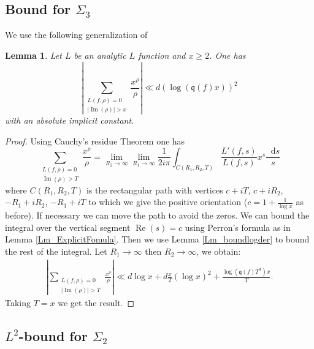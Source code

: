 \documentclass[a4paper,10pt]{amsart}
\theoremstyle{plain}
\newtheorem{lem}[theo]{Lemma}
\theoremstyle{definition}
\begin{document}
\subsection{Bound for $\Sigma_{3}$}

We use the following generalization of \cite[Lem. 2.1]{FioEC}
\begin{lem}\label{Lm_Fiorilli2.1}
Let $L$ be an analytic $L$ function and $x \geq 2$.
One has
$$\left\lvert\sum_{\substack{L(f,\rho)=0 \\ \lvert\operatorname{Im}(\rho)\rvert>x}}\frac{x^{\rho}}{\rho} \right\rvert \ll 
 d\left(\log(\mathfrak{q}(f)x)\right)^{2}$$
 with an absolute implicit constant.
\end{lem}

\begin{proof}
Using Cauchy's residue Theorem one has 
$$\sum_{\substack{L(f,\rho)=0 \\ \operatorname{Im}(\rho)>T}}\frac{x^{\rho}}{\rho}
 =\lim_{R_{2}\rightarrow\infty}\lim_{R_{1}\rightarrow\infty}\frac{1}{2i\pi} 
\int_{C(R_{1},R_{2},T)}\frac{L'(f,s)}{L(f,s)} x^{s}\frac{{\mathop{}\!\mathrm{d}} s}{s} $$
where $C(R_{1},R_{2},T)$ is the rectangular path with vertices
$c+iT$, $c+iR_{2}$, $-R_{1}+ iR_{2}$, $-R_{1}+iT$ to which we give the positive orientation
($c=1 +\frac{1}{\log x}$ as before).
If necessary we can move the path to avoid the zeros.
We can bound the integral over the vertical segment $\operatorname{Re}(s)=c$ using Perron's formula as in Lemma \ref{Lm_ExplicitFomula}.
Then we use Lemma \ref{Lm_boundlogder} to bound the rest of the integral.
Let $R_{1}\rightarrow\infty$ then $R_{2}\rightarrow\infty$, we obtain:
\begin{align}\label{Form_bound_queueSum}
\left\lvert\sum_{\substack{L(f,\rho)=0 \\ \lvert\operatorname{Im}(\rho)\rvert>T}}\frac{x^{\rho}}{\rho} \right\rvert \ll 
d\log x + d\frac{x}{T}(\log x)^2 
+ \frac{\log(\mathfrak{q}(f)T^{d})x}{T}.
\end{align}
Taking $T=x$ we get the result.
\end{proof}

\subsection{$L^{2}$-bound for $\Sigma_{2}$}
\end{document}
